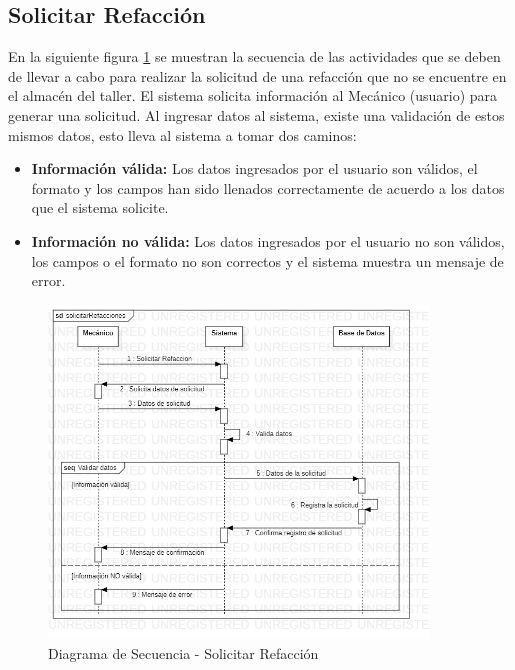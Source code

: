 \subsection{Solicitar Refacción}
En la siguiente figura \ref{fig:Diagrama de Secuencia - Solicitar Refaccion} se muestran la secuencia de las actividades que se deben de llevar a cabo para realizar la solicitud de una refacción que no se encuentre en el almacén del taller. El sistema solicita información al Mecánico (usuario) para generar una solicitud. Al ingresar datos al sistema, existe una validación de estos mismos datos, esto lleva al sistema a tomar dos caminos: 
\begin{itemize}
	\item \textbf{Información válida:} Los datos ingresados por el usuario son válidos, el formato y los campos han sido llenados correctamente de acuerdo a los datos que el sistema solicite.  
	\item \textbf{Información no válida:} Los datos ingresados por el usuario no son válidos, los campos o el formato no son correctos y el sistema muestra un mensaje de error.
\end{itemize} 
\begin{figure}[!h]
	\centering
	\includegraphics[width=0.9\textwidth]{./diseno/vprocesos/imagenes/solicitarRefacciones}
	\caption{Diagrama de Secuencia - Solicitar Refacción}
	\label{fig:Diagrama de Secuencia - Solicitar Refaccion}
\end{figure}
\clearpage